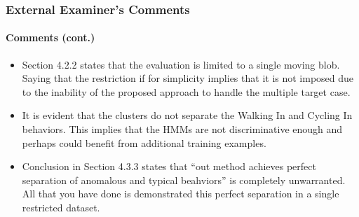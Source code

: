 \begin{frame}
    \frametitle{External Examiner's Comments}
    \framesubtitle{Comments (cont.)}

    \begin{itemize}
        \item Section 4.2.2 states that the evaluation is limited 
            to a single moving blob. Saying that the restriction 
            if for simplicity implies that it is not imposed due to 
            the inability of the proposed approach to handle the multiple 
            target case.
        \item It is evident that the clusters do not separate the Walking In 
            and Cycling In behaviors. This implies that the HMMs are not 
            discriminative enough and perhaps could benefit from additional 
            training examples.
        \item Conclusion in Section 4.3.3 states that ``out method achieves 
            perfect separation of anomalous and typical beahviors'' is completely 
            unwarranted. All that you have done is demonstrated this perfect 
            separation in a single restricted dataset.
    \end{itemize}

\end{frame}



